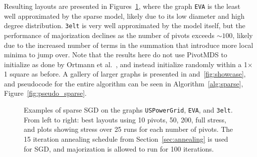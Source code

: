 Resulting layouts are presented in Figures~\ref{fig:pivots}, where the graph \texttt{EVA} is the least well approximated by the sparse model, likely due to its low diameter and high degree distribution. \texttt{3elt} is very well approximated by the model itself, but the performance of majorization declines as the number of pivots exceeds ${\sim}100$, likely due to the increased number of terms in the summation that introduce more local minima to jump over.
Note that the results here do not use PivotMDS \cite{Brandes2007Eigensolver} to initialize as done by Ortmann et al.\ \cite{Ortmann2017}, and instead initialize randomly within a 1$\times$1 square as before.
A gallery of larger graphs is presented in and~\ref{fig:showcase}, and pseudocode for the entire algorithm can be seen in Algorithm~\ref{alg:sparse}, Figure~\ref{fig:pseudo_sparse}.

\begin{figure}
  \centering
  \caption[Results against majorization using sparse stress]{Examples of sparse SGD on the graphs \texttt{USPowerGrid}, \texttt{EVA}, and \texttt{3elt}. From left to right: best layouts using 10 pivots, 50, 200, full stress, and plots showing stress over 25 runs for each number of pivots.
  The 15 iteration annealing schedule from Section~\ref{sec:annealing} is used for SGD, and majorization is allowed to run for 100 iterations.
  }
  \label{fig:pivots}
\end{figure}

